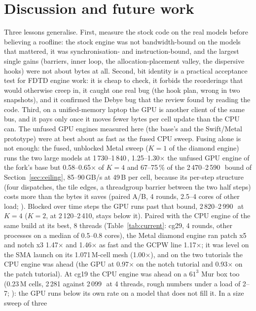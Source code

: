 \section{Discussion and future work}\label{sec:future}
Three lessons generalise. First, measure the stock code on the real models before believing a roofline: the stock
engine was not bandwidth-bound on the models that mattered, it was synchronisation- and instruction-bound, and the
largest single gains (barriers, inner loop, the allocation-placement valley, the dispersive hooks) were not about bytes
at all. Second, bit identity is a practical acceptance test for FDTD engine work: it is cheap to check, it forbids
the reorderings that would otherwise creep in, it caught one real bug (the hook plan, wrong in two snapshots), and it
confirmed the Debye bug that the review found by reading the code. Third, on a unified-memory laptop the GPU is
another client of the same bus, and it pays only once it moves fewer bytes per cell update than the CPU can. The
unfused GPU engines measured here (the base's and the Swift/Metal prototype) were at best about as fast as the fused
CPU sweep. Fusing alone is not enough: the
fused, unblocked Metal sweep ($K=1$ of the diamond engine) runs the two large models at 1\,730--1\,840\,\MC,
1.25--1.30$\times$ the unfused GPU engine of the fork's base but 0.58--0.65$\times$ of $K=4$ and 67--75\,\% of the
2\,470--2\,590\,\MC\ bound of Section~\ref{sec:ceiling}, 85--90\,GB/s at 49\,B per cell, because its per-step
structure (four dispatches, the tile edges, a threadgroup barrier between the two half steps) costs more than the
bytes it saves (paired A/B, 4 rounds, 2.5--4 cores of other load; ).
Blocked over time steps the GPU runs past that bound, 2\,820--2\,990\,\MC\ at $K=4$ ($K=2$, at 2\,120--2\,410, stays
below it). Paired with the CPU engine of the same build at its best, 8 threads (Table~\ref{tab:current}: cg29, 4
rounds, other processes on a median of 0.5--0.8 cores), the Metal diamond engine ran patch x5 and notch x3
1.47$\times$ and 1.46$\times$ as fast and the GCPW line 1.17$\times$; it was level on the SMA launch on its
1.071\,M-cell mesh (1.00$\times$), and on the two tutorials the CPU engine was ahead (the GPU at 0.97$\times$ on the
notch tutorial and 0.93$\times$ on the patch tutorial). At cg19 the CPU engine was ahead on a $61^3$ Mur box too
(0.23\,M cells, 2\,281 against 2\,099\,\MC\ at 4 threads, rough numbers under a load of 2--7;
): the GPU runs below its own rate on a model that does not fill it. In a size sweep of three
